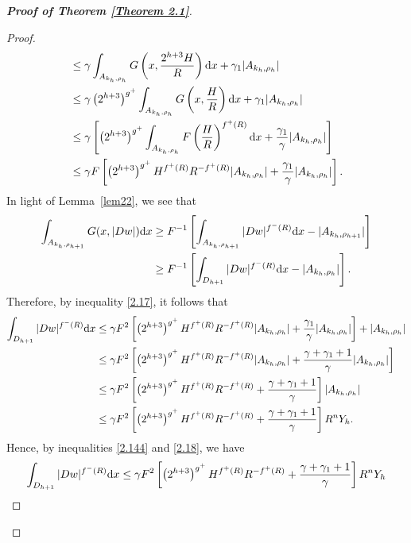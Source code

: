 \documentclass[10pt,reqno]{amsart}
\newcommand *\w{^\wedge}
\theoremstyle{definition}
\numberwithin{equation}{section}
\begin{document}
\begin{proof}[\textbf{Proof of Theorem \ref{Theorem 2.1}}]
\begin{proof}
\begin{align}
\begin{split}
& \leq \gamma \int_{A_{k_h, \rho_h}}G\left(x,  \frac{2^{h+3}H}{R} \right) {\rm d}x + \gamma_1 |A_{k_h, \rho_h}|\\
& \leq \gamma \left(2^{h+3}\right)^{g^+} \int_{A_{k_h, \rho_h}}G\left(x,  \frac{H}{R} \right) {\rm d}x + \gamma_1 |A_{k_h, \rho_h}|\\
& \leq \gamma \left[\left(2^{h+3}\right)^{g^+}\int_{A_{k_h, \rho_h}}F\left(\frac{H}{R} \right)^{f^+(R)}   {\rm d}x  + \frac{\gamma_1}{\gamma} |A_{k_h, \rho_h}|\right]\\
& \leq \gamma F\left[\left(2^{h+3}\right)^{g^+} H^{f^+(R)}R^{-f^+(R)}|A_{k_h, \rho_h}| + \frac{\gamma_1}{\gamma} |A_{k_h, \rho_h}|\right].
\end{split}
\end{align}
In light of Lemma~\ref{lem22}, we see that
\begin{align}\label{Ge2h}
\begin{split}
    \int_{A_{k_h, \rho_{h+1}}} G(x,|Dw|){\rm d}x &\geq F^{-1}\left[\int_{A_{k_h, \rho_{h+1}}} |Dw|^{f^-(R)}{\rm d}x - |A_{k_h, \rho_{h+1}}|\right] \\
    & \geq F^{-1}\left[\int_{D_{h+1}} |Dw|^{f^-(R)}{\rm d}x - |A_{k_h, \rho_{h}}|\right].
       \end{split}
\end{align}
Therefore, by inequality \eqref{2.17}, it follows that
\begin{align}\label{2.18}
\begin{split}
\int_{D_{h+1}} |Dw|^{f^-(R)}{\rm d}x &\leq \gamma F^2\left[\left(2^{h+3}\right)^{g^+}H^{f^+(R)}R^{-f^+(R)}|A_{k_h, \rho_h}|   + \frac{\gamma_1}{\gamma} |A_{k_h, \rho_h}|\right]+|A_{k_h, \rho_h}|\\
&\leq \gamma F^2\left[\left(2^{h+3}\right)^{g^+}H^{f^+(R)}R^{-f^+(R)}|A_{k_h, \rho_h}|   + \frac{\gamma+\gamma_1+1}{\gamma} |A_{k_h, \rho_h}|\right]\\
&\leq \gamma F^2\left[\left(2^{h+3}\right)^{g^+}H^{f^+(R)}R^{-f^+(R)}   + \frac{\gamma+\gamma_1+1}{\gamma} \right]|A_{k_h, \rho_h}|\\
&\leq \gamma F^2\left[\left(2^{h+3}\right)^{g^+}H^{f^+(R)}R^{-f^+(R)}   + \frac{\gamma+\gamma_1+1}{\gamma} \right]R^nY_h.
\end{split}
\end{align}
Hence, by inequalities \eqref{2.144} and \eqref{2.18}, we have 
\begin{align}\label{Ge6}
\begin{split}
\int_{D_{h+1}} |Dw|^{f^-(R)}{\rm d}x 
&\leq  \gamma F^2\left[\left(2^{h+3}\right)^{g^+}H^{f^+(R)}R^{-f^+(R)}   + \frac{\gamma+\gamma_1+1}{\gamma} \right]R^nY_h\\

\end{split}
\end{align}
\end{proof}
\end{proof}
\end{document}
